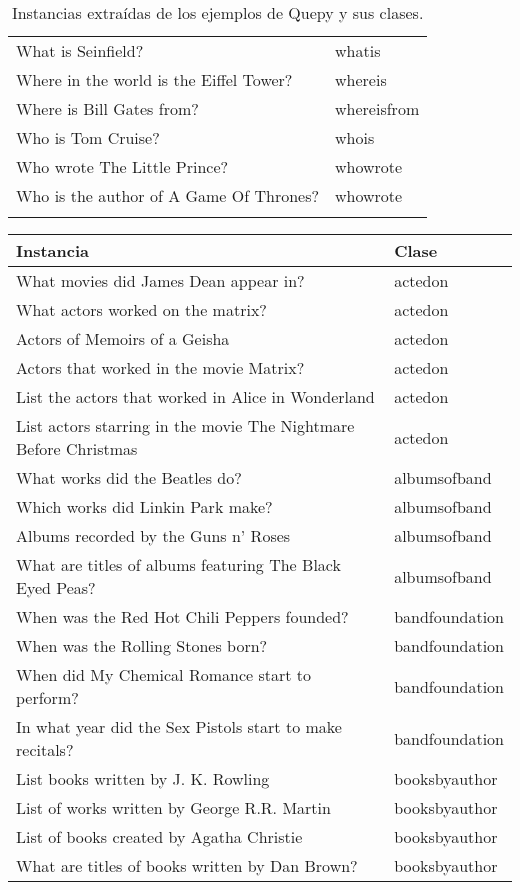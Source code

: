 \begin{longtable}{l l}
What is Seinfield? & whatis\\
Where in the world is the Eiffel Tower? & whereis\\
Where is Bill Gates from? & whereisfrom\\
Who is Tom Cruise? & whois\\
Who wrote The Little Prince? & whowrote\\
Who is the author of A Game Of Thrones? & whowrote\\
\hline
\caption{Instancias extraídas de los ejemplos de Quepy y sus clases.}
\end{longtable}

\begin{longtable}{l l}
Instancia & Clase \\
\hline
What movies did James Dean appear in? & actedon \\
What actors worked on the matrix? & actedon \\
Actors of Memoirs of a Geisha & actedon \\
Actors that worked in the movie Matrix? & actedon \\
List the actors that worked in Alice in Wonderland & actedon \\
List actors starring in the movie The Nightmare Before Christmas & actedon \\
What works did the Beatles do? & albumsofband \\
Which works did Linkin Park make? & albumsofband \\
Albums recorded by the Guns n' Roses & albumsofband \\
What are titles of albums featuring The Black Eyed Peas? & albumsofband \\
When was the Red Hot Chili Peppers founded? & bandfoundation \\
When was the Rolling Stones born? & bandfoundation \\
When did My Chemical Romance start to perform? & bandfoundation \\
In what year did the Sex Pistols start to make recitals? & bandfoundation \\
List books written by J. K. Rowling & booksbyauthor \\
List of works written by George R.R. Martin & booksbyauthor \\
List of books created by Agatha Christie & booksbyauthor \\
What are titles of books written by Dan Brown? & booksbyauthor \\

\end{longtable}
